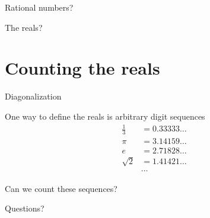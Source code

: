 \documentclass[xcolor=svgnames]{beamer}
\begin{document}
\begin{frame}{}
  \begin{center}
    \Huge Rational numbers?
  \end{center}
\end{frame}

\begin{frame}{}
  \begin{center}
    \Huge The reals?
  \end{center}
\end{frame}

\section{Counting the reals}

\begin{frame}{}
  \begin{center}
    \Huge Diagonalization
  \end{center}
\end{frame}

\begin{frame}{}
  One way to define the reals is arbitrary digit sequences \pause
  \begin{align}
    \frac{1}{3} & = 0.33333 \dots \\
       \pi      & = 3.14159 \dots \\
       e        & = 2.71828 \dots \\
       \sqrt{2} & = 1.41421 \dots \\
                & \cdots
  \end{align} \pause

  Can we count these sequences?
\end{frame}

\begin{frame}{}
  \begin{center}
    \Huge Questions?
  \end{center}
\end{frame}
\end{document}

